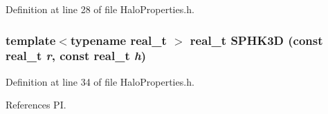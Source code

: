 Definition at line 28 of file HaloProperties.h.

\subsubsection[{SPHK3D}]{\setlength{\rightskip}{0pt plus 5cm}template$<$typename real\_\-t $>$ real\_\-t SPHK3D (const real\_\-t {\em r}, \/  const real\_\-t {\em h})}\label{HaloProperties_8h_a0cb8e9ba7bd0b1861c15a42aa799dcd4}


Definition at line 34 of file HaloProperties.h.



References PI.

